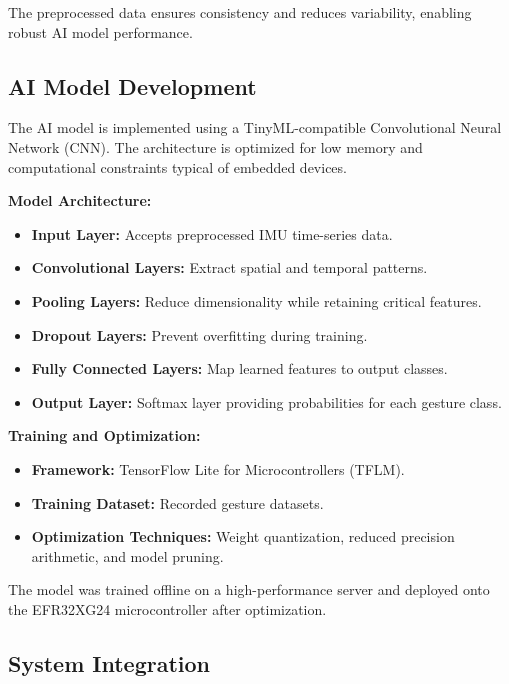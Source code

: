 \documentclass[
  9pt,
  letterpaper,
  abstract,
  titlepage]{scrbook}
\begin{document}
The preprocessed data ensures consistency and reduces variability,
enabling robust AI model performance.

\subsection{AI Model Development}\label{ai-model-development}

The AI model is implemented using a TinyML-compatible Convolutional
Neural Network (CNN). The architecture is optimized for low memory and
computational constraints typical of embedded devices.

\textbf{Model Architecture:}

\begin{itemize}
\item
  \textbf{Input Layer:} Accepts preprocessed IMU time-series data.
\item
  \textbf{Convolutional Layers:} Extract spatial and temporal patterns.
\item
  \textbf{Pooling Layers:} Reduce dimensionality while retaining
  critical features.
\item
  \textbf{Dropout Layers:} Prevent overfitting during training.
\item
  \textbf{Fully Connected Layers:} Map learned features to output
  classes.
\item
  \textbf{Output Layer:} Softmax layer providing probabilities for each
  gesture class.
\end{itemize}

\textbf{Training and Optimization:}

\begin{itemize}
\item
  \textbf{Framework:} TensorFlow Lite for Microcontrollers (TFLM).
\item
  \textbf{Training Dataset:} Recorded gesture datasets.
\item
  \textbf{Optimization Techniques:} Weight quantization, reduced
  precision arithmetic, and model pruning.
\end{itemize}

The model was trained offline on a high-performance server and deployed
onto the EFR32XG24 microcontroller after optimization.

\subsection{System Integration}\label{system-integration}
\end{document}
